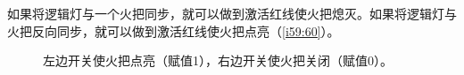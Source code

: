 \begin{figure}[!ht]
\begin{center}
\end{center}
\caption{}
\label{i52:53}
\end{figure}

如果将逻辑灯与一个火把同步，就可以做到激活红线使火把熄灭。如果将逻辑灯与火把反向同步，就可以做到激活红线使火把点亮（\autoref{i59:60}）。

\begin{figure}[!ht]
\begin{center}
\end{center}
\caption{左边开关使火把点亮（赋值1），右边开关使火把关闭（赋值0）。}
\label{i59:60}
\end{figure}

